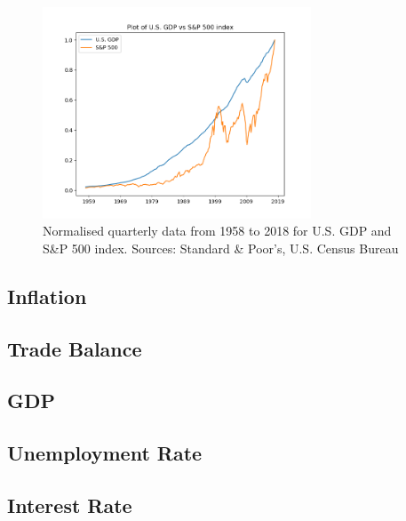\documentclass{UoYCSproject}
\begin{document}
\begin{figure}[ht]
\includegraphics[width=8cm]{GDPvsSP500}
\centering
\caption{Normalised quarterly data from 1958 to 2018 for U.S. GDP and S\&P 500 index. Sources: Standard \& Poor's, U.S. Census Bureau} 
\label{fig:gdpvssp500}
\end{figure}

\subsection{Inflation}


\subsection{Trade Balance}
\subsection{GDP}
\subsection{Unemployment Rate}
\subsection{Interest Rate}

\medskip
 
\printbibliography
\end{document}
